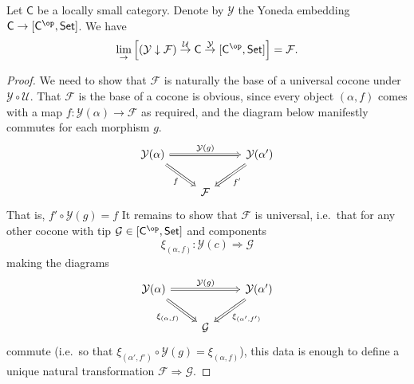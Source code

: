 \documentclass[notes.tex]{subfiles}
\begin{document}
\begin{lemma}
  \label{lemma:colimit_of_comma_category}
  Let $\mathsf{C}$ be a locally small category. Denote by $\mathcal{Y}$ the Yoneda embedding $\mathsf{C} \to [\mathsf{C}^{\op}, \mathsf{Set}]$. We have
  \begin{equation*}
    \lim_{\rightarrow} \left[ (\mathcal{Y} \downarrow \mathcal{F}) \overset{\mathcal{U}}{\to} \mathsf{C} \overset{\mathcal{Y}}{\to} [\mathsf{C}^{\op}, \mathsf{Set}] \right] = \mathcal{F}.
  \end{equation*}
\end{lemma}
\begin{proof}
  We need to show that $\mathcal{F}$ is naturally the base of a universal cocone under $\mathcal{Y} \circ \mathcal{U}$. That $\mathcal{F}$ is the base of a cocone is obvious, since every object $(\alpha, f)$ comes with a map $f\colon \mathcal{Y}(\alpha) \to \mathcal{F}$ as required, and the diagram below manifestly commutes for each morphism $g$.
  \begin{equation*}
    \begin{tikzcd}
      \mathcal{Y}(\alpha)
      \arrow[rd, swap, Rightarrow, "f"]
      \arrow[rr, Rightarrow, "\mathcal{Y}(g)"]
      && \mathcal{Y}(\alpha')
      \arrow[ld, Rightarrow, "f'"]
      \\
      & \mathcal{F}
    \end{tikzcd}
  \end{equation*}
  That is, $f' \circ \mathcal{Y}(g) = f$
  It remains to show that $\mathcal{F}$ is universal, i.e.\ that for any other cocone with tip $\mathcal{G} \in [\mathsf{C}^{\op}, \mathsf{Set}]$ and components
  \begin{equation*}
    \xi_{(\alpha, f)}\colon \mathcal{Y}(c) \Rightarrow \mathcal{G}
  \end{equation*}
  making the diagrams
  \begin{equation*}
    \begin{tikzcd}
      \mathcal{Y}(\alpha)
      \arrow[rd, swap, Rightarrow, "\xi_{(\alpha, f)}"]
      \arrow[rr, Rightarrow, "\mathcal{Y}(g)"]
      && \mathcal{Y}(\alpha')
      \arrow[ld, Rightarrow, "\xi_{(\alpha', f')}"]
      \\
      & \mathcal{G}
    \end{tikzcd}
  \end{equation*}
  commute (i.e.\ so that $\xi_{(\alpha', f')} \circ \mathcal{Y}(g) = \xi_{(\alpha, f)}$), this data is enough to define a unique natural transformation $\mathcal{F} \Rightarrow \mathcal{G}$.


\end{proof}
\end{document}
